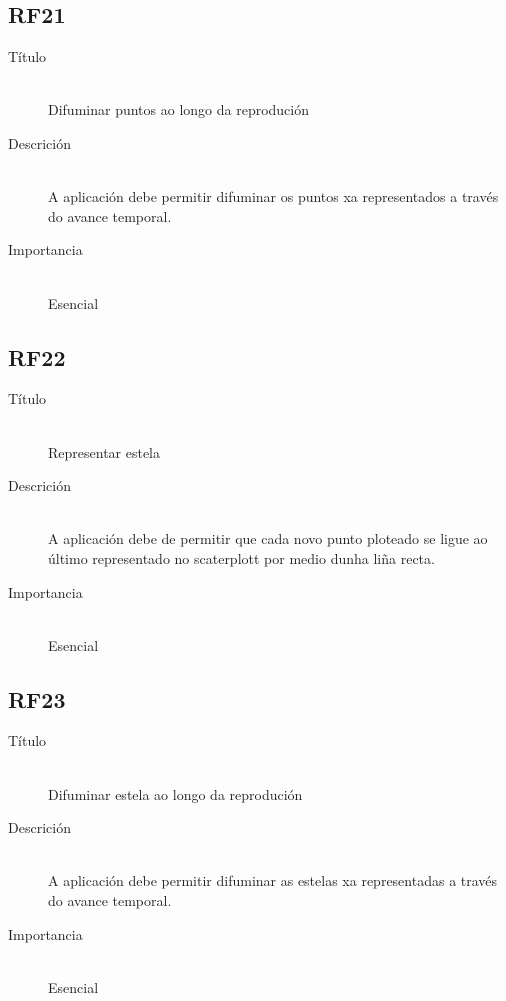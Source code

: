\subsection*{RF21}
\begin{description}
\item[Título] \hfill \\
Difuminar puntos ao longo da reprodución
\item[Descrición] \hfill \\
A aplicación debe permitir difuminar os puntos xa representados a través do avance temporal.
\item[Importancia] \hfill \\
Esencial
\end{description}

\subsection*{RF22}
\begin{description}
\item[Título] \hfill \\
Representar estela
\item[Descrición] \hfill \\
A aplicación debe de permitir que cada novo punto ploteado se ligue ao último representado no scaterplott por medio dunha liña recta.
\item[Importancia] \hfill \\
Esencial
\end{description}

\subsection*{RF23}
\begin{description}
\item[Título] \hfill \\
Difuminar estela ao longo da reprodución
\item[Descrición] \hfill \\
A aplicación debe permitir difuminar as estelas xa representadas a través do avance temporal.
\item[Importancia] \hfill \\
Esencial
\end{description}

